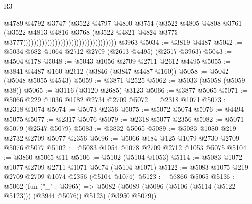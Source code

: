 \begin{lexlean}{R3}
\begin{coremodule}
                                                                  @4789
                                                                  @4792
                                                                  @3747
                                                                  (@3522
                                                                    @4797
                                                                    @4800
                                                                    @3754
                                                                    (@3522
                                                                      @4805
                                                                      @4808
                                                                      @3761
                                                                      (@3522
                                                                        @4813
                                                                        @4816
                                                                        @3768
                                                                        (@3522
                                                                          @4821
                                                                          @4824
                                                                          @3775
                                                                          @3777)))))))))))))))))))))))))))))))))))
    @3963
@5034 := @3819 @4487
@5042 := @5034 @682 @1064 @2712 @2709 (@2613 @4495) (@2517 @3963)
@5043 := @4504 @178
@5048 := @5043 @1056 @2709 @2711 @2612 @4495
@5055 := @3841 @4487 @160 @2612 (@3846 (@3847 @4487 @160))
@5058 := @5042 (@5048 @5055 @4543)
@5059 := @3871 @2525
@5062 := @5033 (@5058 (@5059 @38))
@5065 := @3116 (@3120 @2685) @3123
@5066 := @3877 @5065
@5071 := @5066 @229 @1036 @1082 @2734 @2709
@5072 := @2318 @1071
@5073 := @2318 @1074
@5074 := @5073 @2356
@5075 := @5072 @5074
@5076 := @4494 @5075
@5077 := @2317 @5076
@5079 := @2318 @5077 @2356
@5082 := @5071 @5079 (@2547 @5079)
@5083 := @3832 @5065
@5089 := @5083 @1080 @219 @2732 @2709 @5077 @2356
@5096 := @5066 @184 @125 @1079 @2730 @2709 @5076 @5077
@5102 := @5083 @1054 @1078 @2709 @2712 @1053 @5075
@5104 := @3860 @5065 @11
@5106 := @5102 (@5104 @1053)
@5114 := @5083 @1072 @1077 @2709 @2711 @1071 @5074 (@5104 @1071)
@5122 := @5083 @1075 @219 @2709 @2709 @1074 @2356 (@5104 @1074)
@5123 := @3866 @5065
@5136 := @5062
    (fun ("_" : @3965) =>
    @5082 (@5089 (@5096 (@5106 (@5114 (@5122 @5123))) (@3944 @5076)) @5123) (@3950 @5079))

\end{coremodule}
\end{lexlean}

